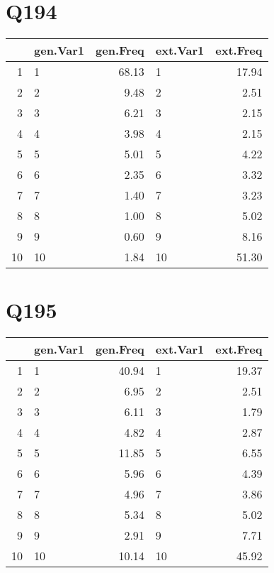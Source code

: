 \documentclass{amsart}
\begin{document}
\section{Q194}
\begin{table}[ht]
\centering
\begin{tabular}{rlrlr}
  \hline
 & gen.Var1 & gen.Freq & ext.Var1 & ext.Freq \\ 
  \hline
1 & 1 & 68.13 & 1 & 17.94 \\ 
  2 & 2 & 9.48 & 2 & 2.51 \\ 
  3 & 3 & 6.21 & 3 & 2.15 \\ 
  4 & 4 & 3.98 & 4 & 2.15 \\ 
  5 & 5 & 5.01 & 5 & 4.22 \\ 
  6 & 6 & 2.35 & 6 & 3.32 \\ 
  7 & 7 & 1.40 & 7 & 3.23 \\ 
  8 & 8 & 1.00 & 8 & 5.02 \\ 
  9 & 9 & 0.60 & 9 & 8.16 \\ 
  10 & 10 & 1.84 & 10 & 51.30 \\ 
   \hline
\end{tabular}
\end{table}

\section{Q195}
\begin{table}[ht]
\centering
\begin{tabular}{rlrlr}
  \hline
 & gen.Var1 & gen.Freq & ext.Var1 & ext.Freq \\ 
  \hline
1 & 1 & 40.94 & 1 & 19.37 \\ 
  2 & 2 & 6.95 & 2 & 2.51 \\ 
  3 & 3 & 6.11 & 3 & 1.79 \\ 
  4 & 4 & 4.82 & 4 & 2.87 \\ 
  5 & 5 & 11.85 & 5 & 6.55 \\ 
  6 & 6 & 5.96 & 6 & 4.39 \\ 
  7 & 7 & 4.96 & 7 & 3.86 \\ 
  8 & 8 & 5.34 & 8 & 5.02 \\ 
  9 & 9 & 2.91 & 9 & 7.71 \\ 
  10 & 10 & 10.14 & 10 & 45.92 \\ 
   \hline
\end{tabular}
\end{table}
\end{document}

